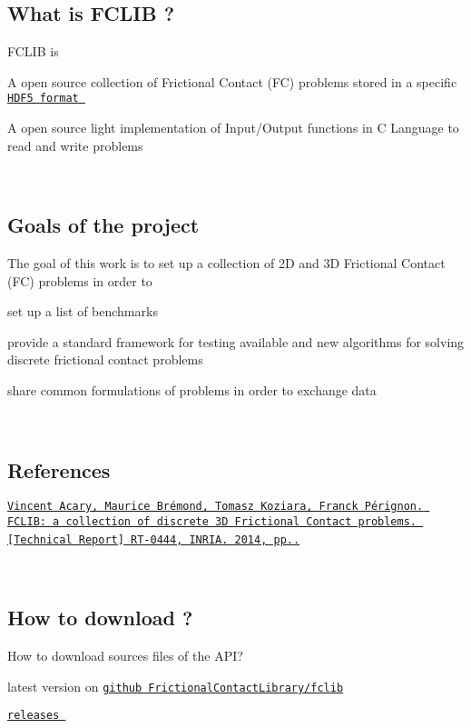 \hypertarget{index_whatis}{}\subsection{What is F\+C\+L\+I\+B ?}\label{index_whatis}
F\+C\+L\+I\+B is 
\begin{DoxyItemize}
\item A open source collection of Frictional Contact (F\+C) problems stored in a specific \href{http://www.hdfgroup.org/HDF5/}{\tt H\+D\+F5 format } 
\item A open source light implementation of Input/\+Output functions in C Language to read and write problems  
\end{DoxyItemize}~\newline
\hypertarget{index_goals}{}\subsection{Goals of the project}\label{index_goals}
The goal of this work is to set up a collection of 2\+D and 3\+D Frictional Contact (F\+C) problems in order to


\begin{DoxyItemize}
\item set up a list of benchmarks  
\item provide a standard framework for testing available and new algorithms for solving discrete frictional contact problems  
\item share common formulations of problems in order to exchange data 
\end{DoxyItemize}~\newline
\hypertarget{index_References}{}\subsection{References}\label{index_References}
\href{https://hal.inria.fr/hal-00945820v2/document}{\tt Vincent Acary, Maurice Br\'{e}mond, Tomasz Koziara, Franck P\'{e}rignon. F\+C\+L\+I\+B\+: a collection of discrete 3\+D Frictional Contact problems. \mbox{[}Technical Report\mbox{]} R\+T-\/0444, I\+N\+R\+I\+A. 2014, pp..} ~\newline


~\newline
 \hypertarget{index_howtodownload}{}\subsection{How to download  ?}\label{index_howtodownload}
How to download sources files of the A\+P\+I? 
\begin{DoxyItemize}
\item latest version on \href{https://github.com/FrictionalContactLibrary/fclib}{\tt github Frictional\+Contact\+Library/fclib} 
\item \href{https://github.com/FrictionalContactLibrary/fclib/releases}{\tt releases } 
\end{DoxyItemize}

